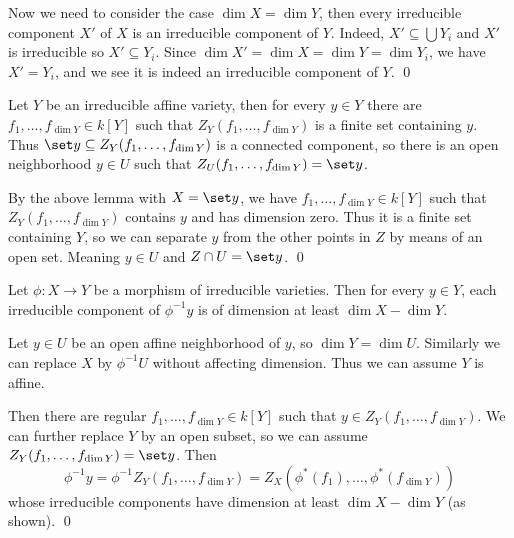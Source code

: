     Now we need to consider the case $\dim X=\dim Y$, then every irreducible component $X'$ of $X$ is an irreducible component of $Y$.
    Indeed, $X'\subseteq\bigcup Y_i$ and $X'$ is irreducible so $X'\subseteq Y_i$.
    Since $\dim X'=\dim X=\dim Y=\dim Y_i$, we have $X'=Y_i$, and we see it is indeed an irreducible component of $Y$.
    \qed

\eproof

\bcoro

    Let $Y$ be an irreducible affine variety, then for every $y\in Y$ there are $f_1,\dots,f_{\dim Y}\in k[Y]$ such that
    $Z_Y(f_1,\dots,f_{\dim Y})$ is a finite set containing $y$.
    Thus $\set y\subseteq Z_Y(f_1,\dots,f_{\dim Y})$ is a connected component, so there is an open neighborhood $y\in U$ such that
    $Z_U(f_1,\dots,f_{\dim Y})=\set y$.

\ecoro

\bproof

    By the above lemma with $X=\set y$, we have $f_1,\dots,f_{\dim Y}\in k[Y]$ such that $Z_Y(f_1,\dots,f_{\dim Y})$ contains $y$
    and has dimension zero.
    Thus it is a finite set containing $Y$, so we can separate $y$ from the other points in $Z$ by means of an open set.
    Meaning $y\in U$ and $Z\cap U=\set y$.
    \qed

\eproof

\bcoro

    Let $\phi\colon X\to Y$ be a morphism of irreducible varieties.
    Then for every $y\in Y$, each irreducible component of $\phi^{-1}y$ is of dimension at least $\dim X-\dim Y$.

\ecoro

\bproof

    Let $y\in U$ be an open affine neighborhood of $y$, so $\dim Y=\dim U$.
    Similarly we can replace $X$ by $\phi^{-1}U$ without affecting dimension.
    Thus we can assume $Y$ is affine.

    Then there are regular $f_1,\dots,f_{\dim Y}\in k[Y]$ such that $y\in Z_Y(f_1,\dots,f_{\dim Y})$.
    We can further replace $Y$ by an open subset, so we can assume $Z_Y(f_1,\dots,f_{\dim Y})=\set y$.
    Then
    $$ \phi^{-1}y = \phi^{-1}Z_Y(f_1,\dots,f_{\dim Y}) = Z_X(\phi^*(f_1),\dots,\phi^*(f_{\dim Y})) $$
    whose irreducible components have dimension at least $\dim X-\dim Y$ (as shown).
    \qed

\eproof

